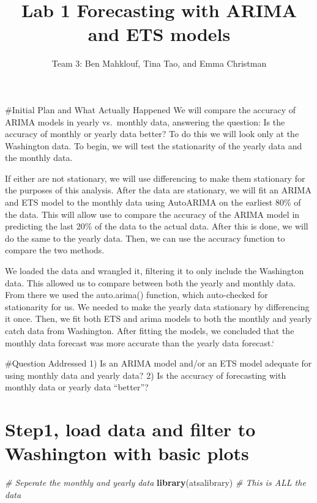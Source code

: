 \documentclass[
]{article}
\title{Lab 1 Forecasting with ARIMA and ETS models}
\author{Team 3: Ben Mahklouf, Tina Tao, and Emma Christman}
\date{}
\newenvironment{Shaded}{\begin{snugshade}}{\end{snugshade}}
\newcommand{\CommentTok}[1]{\textcolor[rgb]{0.56,0.35,0.01}{\textit{#1}}}
\newcommand{\FunctionTok}[1]{\textcolor[rgb]{0.13,0.29,0.53}{\textbf{#1}}}
\newcommand{\NormalTok}[1]{#1}
\begin{document}
\maketitle

{
\setcounter{tocdepth}{2}
\tableofcontents
}
\#Initial Plan and What Actually Happened We will compare the accuracy
of ARIMA models in yearly vs.~monthly data, answering the question: Is
the accuracy of monthly or yearly data better? To do this we will look
only at the Washington data. To begin, we will test the stationarity of
the yearly data and the monthly data.

If either are not stationary, we will use differencing to make them
stationary for the purposes of this analysis. After the data are
stationary, we will fit an ARIMA and ETS model to the monthly data using
AutoARIMA on the earliest 80\% of the data. This will allow use to
compare the accuracy of the ARIMA model in predicting the last 20\% of
the data to the actual data. After this is done, we will do the same to
the yearly data. Then, we can use the accuracy function to compare the
two methods.

We loaded the data and wrangled it, filtering it to only include the
Washington data. This allowed us to compare between both the yearly and
monthly data. From there we used the auto.arima() function, which
auto-checked for stationarity for us. We needed to make the yearly data
stationary by differencing it once. Then, we fit both ETS and arima
models to both the monthly and yearly catch data from Washington. After
fitting the models, we concluded that the monthly data forecast was more
accurate than the yearly data forecast.`

\#Question Addressed 1) Is an ARIMA model and/or an ETS model adequate
for using monthly data and yearly data? 2) Is the accuracy of
forecasting with monthly data or yearly data ``better''?

\section{Step1, load data and filter to Washington with basic
plots}\label{step1-load-data-and-filter-to-washington-with-basic-plots}

\begin{Shaded}
\begin{Highlighting}[]
\CommentTok{\# Seperate the monthly and yearly data }
\FunctionTok{library}\NormalTok{(atsalibrary) }\CommentTok{\# This is ALL the data }
\end{Highlighting}
\end{Shaded}
\end{document}
